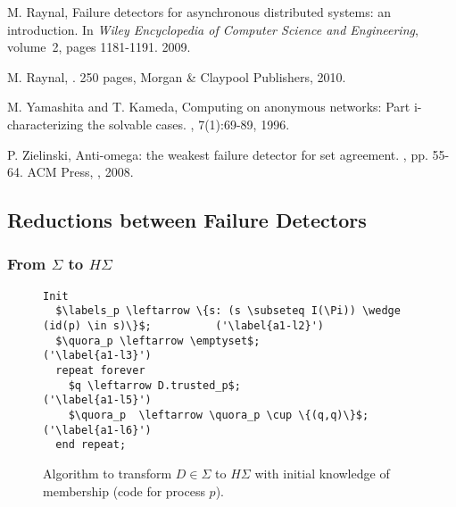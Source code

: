 \documentclass[10pt, conference, compsocconf]{IEEEtran}
\newcommand{\HS}{{H\Sigma}}
\newcommand{\quora}{{\mathit{h\_quora}}}
\newcommand{\labels}{{\mathit{h\_labels}}}
\begin{document}
\begin{thebibliography}{10}
{
M.  Raynal,
\newblock Failure detectors for asynchronous distributed systems: an
  introduction.
\newblock In {\em Wiley Encyclopedia of Computer Science and Engineering},
  volume~2, pages 1181-1191. 2009.

M. Raynal,
. 250 pages, 
\newblock Morgan \& Claypool Publishers, 2010.

M. Yamashita and T.  Kameda,
\newblock Computing on anonymous networks: Part i-characterizing the solvable
  cases.
, 7(1):69-89, 1996.

P. Zielinski,
\newblock Anti-omega: the weakest failure detector for set agreement.
, pp.    55-64. ACM Press, , 2008.

}

\end{thebibliography}


\newpage
\appendix



\subsection{Reductions between Failure Detectors}
\label{appendixred-FD}

\subsubsection{From $\Sigma$ to $\HS$}

\begin{figure}
\begin{lstlisting}
Init
  $\labels_p \leftarrow \{s: (s \subseteq I(\Pi)) \wedge (id(p) \in s)\}$;			('\label{a1-l2}')
  $\quora_p \leftarrow \emptyset$;											('\label{a1-l3}')
  repeat forever
    $q \leftarrow D.trusted_p$; 												('\label{a1-l5}')
    $\quora_p  \leftarrow \quora_p \cup \{(q,q)\}$;								('\label{a1-l6}')
  end repeat; 
\end{lstlisting}		
\caption{Algorithm to transform $D \in \Sigma$ to $\HS$ with initial knowledge of membership (code for process $p$).}
\label{Fig-S-to-HS-si-mship}
\end{figure}
\end{document}
